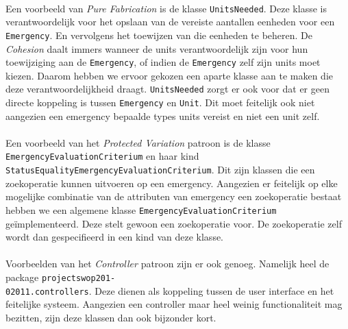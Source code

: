 \paragraph{}
Een voorbeeld van \textit{Pure Fabrication} is de klasse \texttt{UnitsNeeded}. Deze klasse is verantwoordelijk voor het opslaan van de vereiste aantallen eenheden voor een \texttt{Emergency}. En vervolgens het toewijzen van die eenheden te beheren. De \textit{Cohesion} daalt immers wanneer de units verantwoordelijk zijn voor hun toewijziging aan de \texttt{Emergency}, of indien de \texttt{Emergency} zelf zijn units moet kiezen. Daarom hebben we ervoor gekozen een aparte klasse aan te maken die deze verantwoordelijkheid draagt. \texttt{UnitsNeeded} zorgt er ook voor dat er geen directe koppeling is tussen \texttt{Emergency} en \texttt{Unit}. Dit moet feitelijk ook niet aangezien een emergency bepaalde types units vereist en niet een unit zelf.
\paragraph{} Een voorbeeld van het \textit{Protected Variation} patroon is de klasse \texttt{Emergency\-Evaluation\-Criterium} en haar kind \texttt{StatusEqualityEmergencyEvaluationCriterium}. Dit zijn klassen die een zoekoperatie kunnen uitvoeren op een emergency. Aangezien er feitelijk op elke mogelijke combinatie van de attributen van emergency een zoekoperatie bestaat hebben we een algemene klasse \texttt{EmergencyEvaluationCriterium} ge\"implementeerd. Deze stelt gewoon een zoekoperatie voor. De zoekoperatie zelf wordt dan gespecifieerd in een kind van deze klasse.
\paragraph{}
Voorbeelden van het \textit{Controller} patroon zijn er ook genoeg. Namelijk heel de package \texttt{projectswop201-}\\\texttt{02011.controllers}. Deze dienen als koppeling tussen de user interface en het feitelijke systeem. Aangezien een controller maar heel weinig functionaliteit mag bezitten, zijn deze klassen dan ook bijzonder kort.
